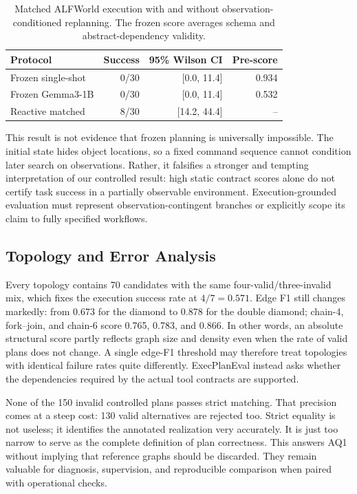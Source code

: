 \documentclass[10pt]{article}
\begin{document}
\begin{table}[t]
\centering
\caption{Matched ALFWorld execution with and without observation-conditioned
replanning. The frozen score averages schema and abstract-dependency validity.}
\label{tab:frozen}
\begin{tabular}{lrrr}
\toprule
Protocol & Success & 95\% Wilson CI & Pre-score \\
\midrule
Frozen single-shot & 0/30 & [0.0, 11.4] & 0.934 \\
Frozen Gemma3-1B & 0/30 & [0.0, 11.4] & 0.532 \\
Reactive matched & 8/30 & [14.2, 44.4] & -- \\
\bottomrule
\end{tabular}
\end{table}

This result is not evidence that frozen planning is universally impossible.
The initial state hides object locations, so a fixed command sequence cannot
condition later search on observations. Rather, it falsifies a stronger and
tempting interpretation of our controlled result: high static contract scores
alone do not certify task success in a partially observable environment.
Execution-grounded evaluation must represent observation-contingent branches
or explicitly scope its claim to fully specified workflows.

\subsection{Topology and Error Analysis}
Every topology contains 70 candidates with the same four-valid/three-invalid
mix, which fixes the execution success rate at $4/7=0.571$. Edge F1 still
changes markedly: from 0.673 for the diamond to 0.878 for the double diamond;
chain-4, fork--join, and chain-6 score 0.765, 0.783, and 0.866. In other words,
an absolute structural score partly reflects graph size and density even when
the rate of valid plans does not change. A single edge-F1 threshold may
therefore treat topologies with identical failure rates quite differently.
ExecPlanEval instead asks whether the dependencies required by the actual tool
contracts are supported.

None of the 150 invalid controlled plans passes strict matching. That precision
comes at a steep cost: 130 valid alternatives are rejected too. Strict equality
is not useless; it identifies the annotated realization very accurately. It is
just too narrow to serve as the complete definition of plan correctness. This
answers AQ1 without implying that reference graphs should be discarded. They
remain valuable for diagnosis, supervision, and reproducible comparison when
paired with operational checks.
\end{document}
